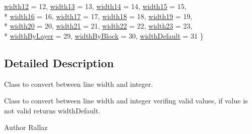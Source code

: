 \begin{DoxyCompactItemize}
\hyperlink{class_d_r_w___l_w___conv_aed68cbc3d8bdf7e20003dd2d970279b3aff60246d9f43ab88f2a128a6755522df}{width12} = 12, 
\hyperlink{class_d_r_w___l_w___conv_aed68cbc3d8bdf7e20003dd2d970279b3ab270b1411e0a8cfb209793262b208c9e}{width13} = 13, 
\hyperlink{class_d_r_w___l_w___conv_aed68cbc3d8bdf7e20003dd2d970279b3a0b462588b45aae5b31989c248c9fb8ec}{width14} = 14, 
\hyperlink{class_d_r_w___l_w___conv_aed68cbc3d8bdf7e20003dd2d970279b3ab7cdf855ca689fb9b91a3795222cd824}{width15} = 15, 
\\*
\hyperlink{class_d_r_w___l_w___conv_aed68cbc3d8bdf7e20003dd2d970279b3abce2c49577a99240fb9562c61724e6ff}{width16} = 16, 
\hyperlink{class_d_r_w___l_w___conv_aed68cbc3d8bdf7e20003dd2d970279b3a095b12d03a51c0da42e0d34a4595e680}{width17} = 17, 
\hyperlink{class_d_r_w___l_w___conv_aed68cbc3d8bdf7e20003dd2d970279b3a57b59dd1e97e6a0af349309e997c3ab7}{width18} = 18, 
\hyperlink{class_d_r_w___l_w___conv_aed68cbc3d8bdf7e20003dd2d970279b3a2a0d3619f28ed9caa63175a90a523812}{width19} = 19, 
\\*
\hyperlink{class_d_r_w___l_w___conv_aed68cbc3d8bdf7e20003dd2d970279b3aa9b310ae50f3e6389e5d2687bc3d9659}{width20} = 20, 
\hyperlink{class_d_r_w___l_w___conv_aed68cbc3d8bdf7e20003dd2d970279b3a5cc5d000ea38449bd040384e181e6379}{width21} = 21, 
\hyperlink{class_d_r_w___l_w___conv_aed68cbc3d8bdf7e20003dd2d970279b3a4e2f7d51662ebe7647c8fa3e853b281f}{width22} = 22, 
\hyperlink{class_d_r_w___l_w___conv_aed68cbc3d8bdf7e20003dd2d970279b3a211d736ceb1820badf30039652355ba0}{width23} = 23, 
\\*
\hyperlink{class_d_r_w___l_w___conv_aed68cbc3d8bdf7e20003dd2d970279b3ac5d0d3025329964b2ea07f29131a50e8}{width\+By\+Layer} = 29, 
\hyperlink{class_d_r_w___l_w___conv_aed68cbc3d8bdf7e20003dd2d970279b3a11fd9dfa615187c6237b092ebfe4330b}{width\+By\+Block} = 30, 
\hyperlink{class_d_r_w___l_w___conv_aed68cbc3d8bdf7e20003dd2d970279b3a2a30bb15248d15595514d75d34e5afd5}{width\+Default} = 31
 \}
\end{DoxyCompactItemize}


\subsection{Detailed Description}
Class to convert between line width and integer. 

Class to convert between line width and integer verifing valid values, if value is not valid returns width\+Default. \begin{DoxyAuthor}{Author}
Rallaz 
\end{DoxyAuthor}


